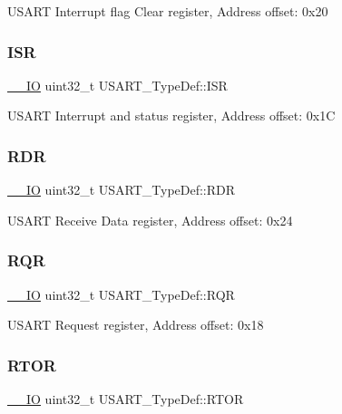 U\+S\+A\+RT Interrupt flag Clear register, Address offset\+: 0x20 \mbox{\label{struct_u_s_a_r_t___type_def_a79ce09e9fbedb2d169b3a584ed003b02}} 
\subsubsection{\texorpdfstring{ISR}{ISR}}
{\footnotesize\ttfamily \mbox{\hyperlink{core__sc300_8h_aec43007d9998a0a0e01faede4133d6be}{\+\_\+\+\_\+\+IO}} uint32\+\_\+t U\+S\+A\+R\+T\+\_\+\+Type\+Def\+::\+I\+SR}

U\+S\+A\+RT Interrupt and status register, Address offset\+: 0x1C \mbox{\label{struct_u_s_a_r_t___type_def_a8d538b7390289142b70428c5b0af0a18}} 
\subsubsection{\texorpdfstring{RDR}{RDR}}
{\footnotesize\ttfamily \mbox{\hyperlink{core__sc300_8h_aec43007d9998a0a0e01faede4133d6be}{\+\_\+\+\_\+\+IO}} uint32\+\_\+t U\+S\+A\+R\+T\+\_\+\+Type\+Def\+::\+R\+DR}

U\+S\+A\+RT Receive Data register, Address offset\+: 0x24 \mbox{\label{struct_u_s_a_r_t___type_def_add7a9e13a3281f6bea133b3693ce68f8}} 
\subsubsection{\texorpdfstring{RQR}{RQR}}
{\footnotesize\ttfamily \mbox{\hyperlink{core__sc300_8h_aec43007d9998a0a0e01faede4133d6be}{\+\_\+\+\_\+\+IO}} uint32\+\_\+t U\+S\+A\+R\+T\+\_\+\+Type\+Def\+::\+R\+QR}

U\+S\+A\+RT Request register, Address offset\+: 0x18 \mbox{\label{struct_u_s_a_r_t___type_def_a5732c379e1ce532552e80392db4eabf8}} 
\subsubsection{\texorpdfstring{RTOR}{RTOR}}
{\footnotesize\ttfamily \mbox{\hyperlink{core__sc300_8h_aec43007d9998a0a0e01faede4133d6be}{\+\_\+\+\_\+\+IO}} uint32\+\_\+t U\+S\+A\+R\+T\+\_\+\+Type\+Def\+::\+R\+T\+OR}

